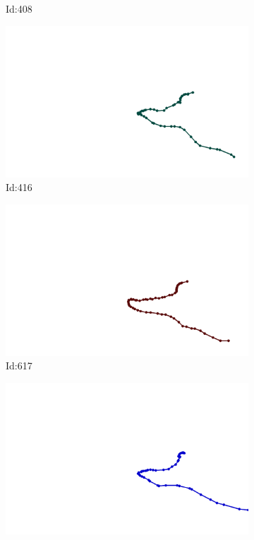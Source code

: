 \documentclass[12pt,twoside]{report}
\begin{document}
\begin{figure}
\begin{subfigure}[b]{0.20\textwidth}
\caption{Id:408}
\end{subfigure}
\begin{subfigure}[b]{0.20\textwidth}
\centering
\includegraphics[width=\textwidth]{../../trajectories/416.png}
\caption{Id:416}
\end{subfigure}
\begin{subfigure}[b]{0.20\textwidth}
\centering
\includegraphics[width=\textwidth]{../../trajectories/617.png}
\caption{Id:617}
\end{subfigure}
\begin{subfigure}[b]{0.20\textwidth}
\centering
\includegraphics[width=\textwidth]{../../trajectories/644.png}

\end{subfigure}
\end{figure}
\end{document}
